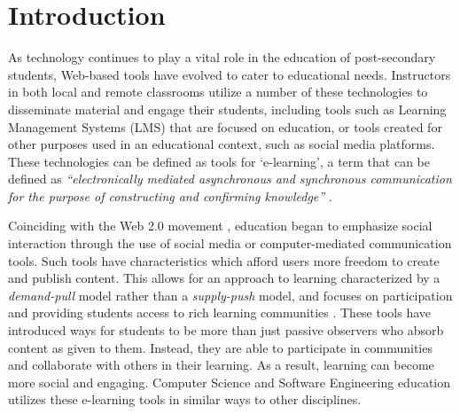 \chapter{Introduction}



As technology continues to play a vital role in the education of post-secondary students, Web-based tools have evolved to cater to educational needs. Instructors in both local and remote classrooms utilize a number of these technologies to disseminate material and engage their students, including tools such as Learning Management Systems (LMS) that are focused on education, or tools created for other purposes used in an educational context, such as social media platforms. These technologies can be defined as tools for `e-learning', a term that can be defined as \textit{``electronically mediated asynchronous and synchronous communication for the purpose of constructing and confirming knowledge''} \cite{garrison2011learning}.

Coinciding with the Web 2.0 movement \cite{O'Reilly-What-2005}, education began to emphasize social interaction through the use of social media or computer-mediated communication tools. Such tools have characteristics which afford users more freedom to create and publish content. This allows for an approach to learning characterized by a \emph{demand-pull} model rather than a \emph{supply-push} model, and focuses on participation and providing students access to rich learning communities \cite{seely2008open}. These tools have introduced ways for students to be more than just passive observers who absorb content as given to them. Instead, they are able to participate in communities and collaborate with others in their learning. As a result, learning can become more social and engaging. Computer Science and Software Engineering education utilizes these e-learning tools in similar ways to other disciplines.


